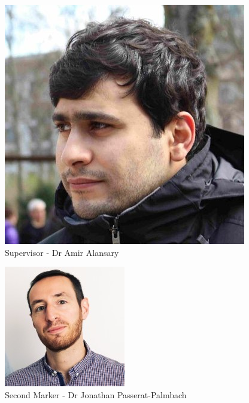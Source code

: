 \begin{figure}[htbp]
	\centering
    \includegraphics[scale=0.3]{appendices/amir.jpg}
    \caption{Supervisor - Dr Amir Alansary}
    \label{amir}
\end{figure}

\begin{figure}[htbp]
	\centering
    \includegraphics[scale=0.6]{appendices/jon.jpg}
    \caption{Second Marker - Dr Jonathan Passerat-Palmbach}
    \label{jon}
\end{figure}

